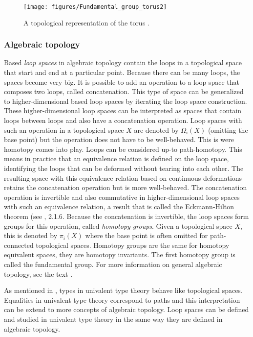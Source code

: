 \documentclass[12pt,a4paper,twoside,xetex]{book} %
\newcommand{\keyword}[1]{\emph{#1}\index{#1}}
\begin{document}
\begin{figure}
\centering
\texttt{[image: figures/Fundamental\_group\_torus2]}
\caption{A topological representation of the torus \cite{Dinkelbach2005}. 
\label{torus}}
\end{figure}

\subsubsection{Algebraic topology}\label{higherhomotopy}

Based \keyword{loop spaces} in algebraic topology contain the loops in a topological space that start and end at a particular point. Because there can be many loops, the spaces become very big. It is possible to add an operation to a loop space that composes two loops, called concatenation. This type of space can be generalized to higher-dimensional based loop spaces by iterating the loop space construction. These higher-dimensional loop spaces can be interpreted as spaces that contain loops between loops and also have a concatenation operation. Loop spaces with such an operation in a topological space $X$ are denoted by $\Omega_i (X)$ (omitting the base point) but the operation does not have to be well-behaved. This is were homotopy comes into play. Loops can be considered up-to path-homotopy. This means in practice that an equivalence relation is defined on the loop space, identifying the loops that can be deformed without tearing into each other. The resulting space with this equivalence relation based on continuous deformations retains the concatenation operation but is more well-behaved. The concatenation operation is invertible and also commutative in higher-dimensional loop spaces with such an equivalence relation, a result that is called the Eckmann-Hilton theorem (see \cite{Voevodsky2013}, 2.1.6. Because the concatenation is invertible, the loop spaces form groups for this operation, called \keyword{homotopy groups}. Given a topological space $X$, this is denoted by $\pi_i(X)$ where the base point is often omitted for path-connected topological spaces. Homotopy groups are the same for homotopy equivalent spaces, they are homotopy invariants. The first homotopy group is called the fundamental group. For more information on general 
algebraic topology, see the text \cite{Hatcher2001}.


As mentioned in , types in univalent type theory behave like topological spaces. Equalities in univalent type theory correspond to paths and this interpretation can be extend to more concepts of algebraic topology. Loop spaces can be defined and studied in univalent type theory in the same way they are defined in algebraic topology. 
\end{document}
